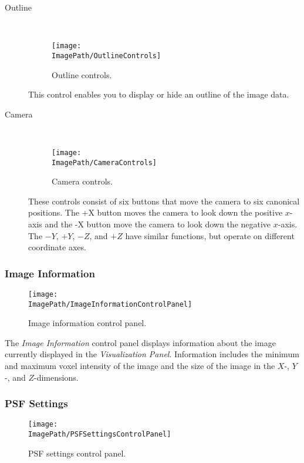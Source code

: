 \documentclass[11pt,titlepage,twoside]{article}
\begin{document}
\begin{description}
  \item[Outline] \hfill \\
  
  \begin{figure}[h]
    \centering
    \texttt{[image: \\ImagePath/OutlineControls]}
    \caption{Outline controls.}
    \label{fig:OutlineControls}
  \end{figure}
  
  
  This control enables you to display or hide an outline of the image data.

  \item[Camera] \hfill \\
  
  \begin{figure}[h]
    \centering
    \texttt{[image: \\ImagePath/CameraControls]}
    \caption{Camera controls.}
    \label{fig:CameraControls}
  \end{figure}
  
  These controls consist of six buttons that move the camera to six canonical positions. The +X button moves the camera to look down the positive $x$-axis and the -X button move the camera to look down the negative $x$-axis. The $-Y$, $+Y$, $-Z$, and $+Z$ have similar functions, but operate on different coordinate axes.

\end{description}

\subsubsection{Image Information}

  \begin{figure}[h]
    \centering
    \texttt{[image: \\ImagePath/ImageInformationControlPanel]}
    \caption{Image information control panel.}
    \label{fig:ImageInformationControlPanel}
  \end{figure}


The \emph{Image Information} control panel displays information about the image currently displayed in the \emph{Visualization Panel}. Information includes the minimum and maximum voxel intensity of the image and the size of the image in the $X$-, $Y$-, and $Z$-dimensions.

\subsubsection{PSF Settings}

\begin{figure}[h]
  \centering
  \texttt{[image: \\ImagePath/PSFSettingsControlPanel]}
  \caption{PSF settings control panel.}
  \label{fig:PSFSettingsControlPanel}
\end{figure}
\end{document}
